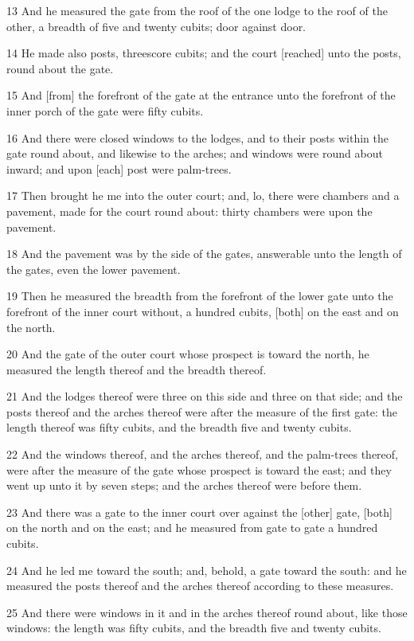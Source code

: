\par 13 And he measured the gate from the roof of the one lodge to the roof of the other, a breadth of five and twenty cubits; door against door.
\par 14 He made also posts, threescore cubits; and the court [reached] unto the posts, round about the gate.
\par 15 And [from] the forefront of the gate at the entrance unto the forefront of the inner porch of the gate were fifty cubits.
\par 16 And there were closed windows to the lodges, and to their posts within the gate round about, and likewise to the arches; and windows were round about inward; and upon [each] post were palm-trees.
\par 17 Then brought he me into the outer court; and, lo, there were chambers and a pavement, made for the court round about: thirty chambers were upon the pavement.
\par 18 And the pavement was by the side of the gates, answerable unto the length of the gates, even the lower pavement.
\par 19 Then he measured the breadth from the forefront of the lower gate unto the forefront of the inner court without, a hundred cubits, [both] on the east and on the north.
\par 20 And the gate of the outer court whose prospect is toward the north, he measured the length thereof and the breadth thereof.
\par 21 And the lodges thereof were three on this side and three on that side; and the posts thereof and the arches thereof were after the measure of the first gate: the length thereof was fifty cubits, and the breadth five and twenty cubits.
\par 22 And the windows thereof, and the arches thereof, and the palm-trees thereof, were after the measure of the gate whose prospect is toward the east; and they went up unto it by seven steps; and the arches thereof were before them.
\par 23 And there was a gate to the inner court over against the [other] gate, [both] on the north and on the east; and he measured from gate to gate a hundred cubits.
\par 24 And he led me toward the south; and, behold, a gate toward the south: and he measured the posts thereof and the arches thereof according to these measures.
\par 25 And there were windows in it and in the arches thereof round about, like those windows: the length was fifty cubits, and the breadth five and twenty cubits.
